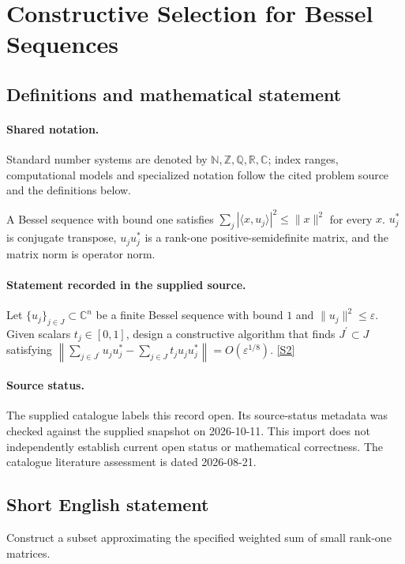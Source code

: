 \documentclass[11pt]{article}
\newcommand{\sref}[2]{\hyperlink{source:#1:#2}{[S#2]}}
\begin{document}
\section{Constructive Selection for Bessel Sequences}\label{statement}

\subsection{Definitions and mathematical statement}

\paragraph{Shared notation.}Standard number systems are denoted by $\mathbb N,\mathbb Z,\mathbb Q,\mathbb R,\mathbb C$; index ranges, computational models and specialized notation follow the cited problem source and the definitions below.


A Bessel sequence with bound one satisfies $\sum_j|\langle x,u_j\rangle|^2\leq\lVert x\rVert^2$ for every $x$. $u_j^*$ is conjugate transpose, $u_ju_j^*$ is a rank-one positive-semidefinite matrix, and the matrix norm is operator norm.
\paragraph{Statement recorded in the supplied source.}
Let $\{u_j\}_{j\in J}\subset\mathbb{C}^n$ be a finite Bessel sequence with bound $1$ and $\lVert u_j\rVert^2\leq\varepsilon$. Given scalars $t_j\in[0,1]$, design a constructive algorithm that finds $J^\prime\subset J$ satisfying $\left\lVert\sum_{j\in J^\prime}u_ju_j^*-\sum_{j\in J}t_ju_ju_j^*\right\rVert=O(\varepsilon^{1/8})$. \sref{statement}{2}
\paragraph{Source status.}
The supplied catalogue labels this record open. Its source-status metadata was checked against the supplied snapshot on 2026-10-11. This import does not independently establish current open status or mathematical correctness. The catalogue literature assessment is dated 2026-08-21.
\subsection{Short English statement}
Construct a subset approximating the specified weighted sum of small rank-one matrices.
\end{document}
